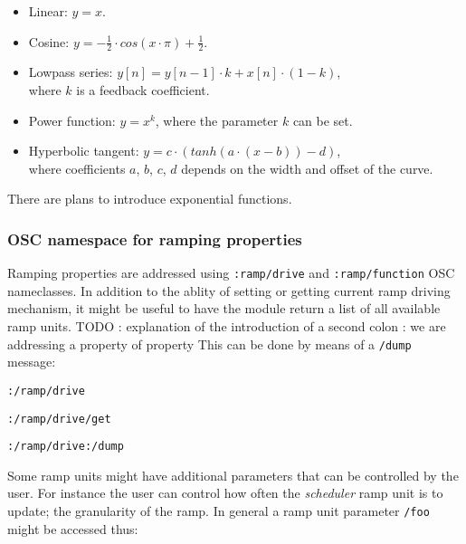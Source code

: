 \documentclass{NIME-alternate}
\begin{document}
\begin{itemize}

	\item Linear: $y = x$.

	\item Cosine: $y = - \frac{1}{2} \cdot cos(x \cdot \pi ) + \frac{1}{2} $.

	\item Lowpass series: $y[n] = y[n-1] \cdot k + x[n] \cdot (1-k)$, \\ where $k$ is a feedback coefficient.

	\item Power function: $ y = x^{k} $, where the parameter $k$ can be set.

	\item Hyperbolic tangent: $ y = c \cdot (tanh(a\cdot(x-b)) - d) $, \\ where coefficients $a$, $b$, $c$, $d$ depends on the width and offset of the curve.
	
\end{itemize}

There are plans to introduce exponential functions.




\subsubsection{OSC namespace for ramping properties} %
\label{ssub:osc_namespace_for_ramping_properties}

Ramping properties are addressed using \texttt{:ramp/drive} and \texttt{:ramp/function} OSC nameclasses. In addition to the ablity of setting or getting current ramp driving mechanism, it might be useful to have the module return a list of all available ramp units. 
TODO : explanation of the introduction of a second colon : we are addressing a property of property 
This can be done by means of a \texttt{/dump} message:

\texttt{:/ramp/drive}

\texttt{:/ramp/drive/get}

\texttt{:/ramp/drive:/dump}

Some ramp units might have additional parameters that can be controlled by the user. For instance the user can control how often the \emph{scheduler} ramp unit is to update; the granularity of the ramp.  In general a ramp unit parameter \texttt{/foo} might be accessed thus:
\end{document}
